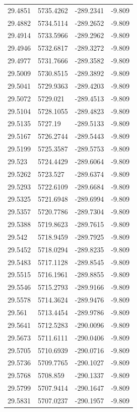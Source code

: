 \begin{table}[H]
\begin{tabular}{llll}
29.4851 & 5735.4262 & -289.2341 & -9.809 \\
29.4882 & 5734.5114 & -289.2652 & -9.809 \\
29.4914 & 5733.5966 & -289.2962 & -9.809 \\
29.4946 & 5732.6817 & -289.3272 & -9.809 \\
29.4977 & 5731.7666 & -289.3582 & -9.809 \\
29.5009 & 5730.8515 & -289.3892 & -9.809 \\
29.5041 & 5729.9363 & -289.4203 & -9.809 \\
29.5072 & 5729.021 & -289.4513 & -9.809 \\
29.5104 & 5728.1055 & -289.4823 & -9.809 \\
29.5135 & 5727.19 & -289.5133 & -9.809 \\
29.5167 & 5726.2744 & -289.5443 & -9.809 \\
29.5199 & 5725.3587 & -289.5753 & -9.809 \\
29.523 & 5724.4429 & -289.6064 & -9.809 \\
29.5262 & 5723.527 & -289.6374 & -9.809 \\
29.5293 & 5722.6109 & -289.6684 & -9.809 \\
29.5325 & 5721.6948 & -289.6994 & -9.809 \\
29.5357 & 5720.7786 & -289.7304 & -9.809 \\
29.5388 & 5719.8623 & -289.7615 & -9.809 \\
29.542 & 5718.9459 & -289.7925 & -9.809 \\
29.5452 & 5718.0294 & -289.8235 & -9.809 \\
29.5483 & 5717.1128 & -289.8545 & -9.809 \\
29.5515 & 5716.1961 & -289.8855 & -9.809 \\
29.5546 & 5715.2793 & -289.9166 & -9.809 \\
29.5578 & 5714.3624 & -289.9476 & -9.809 \\
29.561 & 5713.4454 & -289.9786 & -9.809 \\
29.5641 & 5712.5283 & -290.0096 & -9.809 \\
29.5673 & 5711.6111 & -290.0406 & -9.809 \\
29.5705 & 5710.6939 & -290.0716 & -9.809 \\
29.5736 & 5709.7765 & -290.1027 & -9.809 \\
29.5768 & 5708.859 & -290.1337 & -9.809 \\
29.5799 & 5707.9414 & -290.1647 & -9.809 \\
29.5831 & 5707.0237 & -290.1957 & -9.809 \\

\end{tabular}
\end{table}
